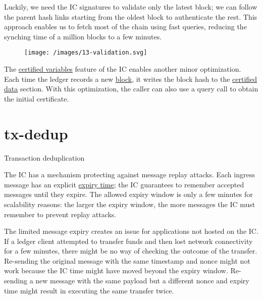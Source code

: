 \documentclass{article}
\begin{document}
Luckily, we need the IC signatures to validate only the latest block; we can follow the parent hash links starting from the oldest block to authenticate the rest.
This approach enables us to fetch most of the chain using fast queries, reducing the synching time of a million blocks to a few minutes.

\begin{figure}[grayscale-diagram]
  \texttt{[image: /images/13-validation.svg]}
\end{figure}

The \href{https://medium.com/dfinity/how-internet-computer-responses-are-certified-as-authentic-2ff1bb1ea659}{certified variables} feature of the IC enables another minor optimization.
Each time the ledger records a new \href{#transactions-and-blocks}{block}, it writes the block hash to the \href{https://internetcomputer.org/docs/current/references/ic-interface-spec#state-tree-certified-data}{certified data} section.
With this optimization, the caller can also use a query call to obtain the initial certificate.

\section{tx-dedup}{Transaction deduplication}

The IC has a mechanism protecting against message replay attacks.
Each ingress message has an explicit \href{https://internetcomputer.org/docs/current/references/ic-interface-spec/#authentication}{expiry time}; the IC guarantees to remember accepted messages until they expire.
The allowed expiry window is only a few minutes for scalability reasons: the larger the expiry window, the more messages the IC must remember to prevent replay attacks.

The limited message expiry creates an issue for applications not hosted on the IC.
If a ledger client attempted to transfer funds and then lost network connectivity for a few minutes, there might be no way of checking the outcome of the transfer.
Re-sending the original message with the same timestamp and nonce might not work because the IC time might have moved beyond the expiry window.
Re-sending a new message with the same payload but a different nonce and expiry time might result in executing the same transfer twice.
\end{document}
